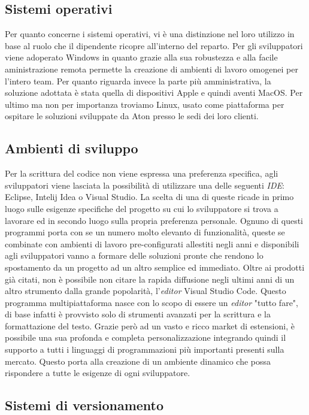 \subsection{Sistemi operativi}

Per quanto concerne i sistemi operativi, vi è una distinzione nel loro utilizzo in base al ruolo che il dipendente ricopre all'interno del reparto. 
Per gli sviluppatori viene adoperato Windows in quanto grazie alla sua robustezza e alla facile aministrazione remota permette la creazione di ambienti
di lavoro omogenei per l'intero team. Per quanto riguarda invece la parte più amministrativa, la soluzione adottata è stata quella di dispositivi Apple
e quindi aventi MacOS. Per ultimo ma non per importanza troviamo Linux, usato come piattaforma per ospitare le soluzioni sviluppate da Aton presso le sedi
dei loro clienti.

\subsection{Ambienti di sviluppo}

Per la scrittura del codice non viene espressa una preferenza specifica, agli sviluppatori viene lasciata la possibilità di utilizzare una delle seguenti
\emph{IDE}: Eclipse, Intelij Idea o Visual Studio. La scelta di una di queste ricade in primo luogo sulle esigenze specifiche del progetto su cui lo
sviluppatore si trova a lavorare ed in secondo luogo sulla propria preferenza personale. Ognuno di questi programmi porta con se un numero molto elevanto
di funzionalità, queste se combinate con ambienti di lavoro pre-configurati allestiti negli anni e disponibili agli sviluppatori vanno a formare delle
soluzioni pronte che rendono lo spostamento da un progetto ad un altro semplice ed immediato.
Oltre ai prodotti già citati, non è possibile non citare la rapida diffusione negli ultimi anni di un altro strumento dalla grande popolarità, 
l'\emph{editor} Visual Studio Code. 
Questo programma multipiattaforma nasce con lo scopo di essere un \emph{editor} "tutto fare",
di base infatti è provvisto solo di strumenti avanzati per la scrittura e la formattazione del testo. Grazie però ad un vasto e ricco market di estensioni,
è possibile una sua profonda e completa personalizzazione integrando quindi il supporto a tutti i linguaggi di programmazioni più importanti presenti sulla
mercato. Questo porta alla creazione di un ambiente dinamico che possa rispondere a tutte le esigenze di ogni sviluppatore.

\subsection{Sistemi di versionamento}

